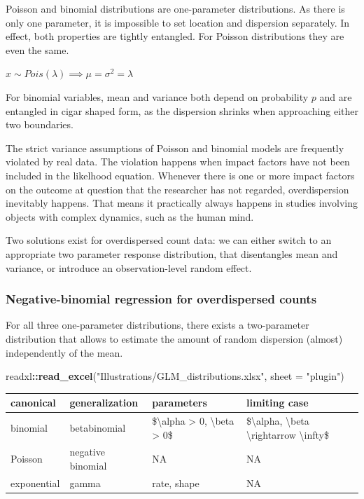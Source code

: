 \documentclass[]{svmono}
\newenvironment{Shaded}{\begin{snugshade}}{\end{snugshade}}
\newcommand{\KeywordTok}[1]{\textcolor[rgb]{0.13,0.29,0.53}{\textbf{#1}}}
\newcommand{\DataTypeTok}[1]{\textcolor[rgb]{0.13,0.29,0.53}{#1}}
\newcommand{\StringTok}[1]{\textcolor[rgb]{0.31,0.60,0.02}{#1}}
\newcommand{\OperatorTok}[1]{\textcolor[rgb]{0.81,0.36,0.00}{\textbf{#1}}}
\newcommand{\NormalTok}[1]{#1}
\theoremstyle{definition}
\theoremstyle{definition}
\theoremstyle{definition}
\theoremstyle{remark}
\begin{document}
Poisson and binomial distributions are one-parameter distributions. As
there is only one parameter, it is impossible to set location and
dispersion separately. In effect, both properties are tightly entangled.
For Poisson distributions they are even the same.

\(x \sim Pois(\lambda) \implies \mu = \sigma^2 = \lambda\)

For binomial variables, mean and variance both depend on probability
\(p\) and are entangled in cigar shaped form, as the dispersion shrinks
when approaching either two boundaries.

The strict variance assumptions of Poisson and binomial models are
frequently violated by real data. The violation happens when impact
factors have not been included in the likelhood equation. Whenever there
is one or more impact factors on the outcome at question that the
researcher has not regarded, overdispersion inevitably happens. That
means it practically always happens in studies involving objects with
complex dynamics, such as the human mind.

Two solutions exist for overdispersed count data: we can either switch
to an appropriate two parameter response distribution, that disentangles
mean and variance, or introduce an observation-level random effect.

\subsubsection{Negative-binomial regression for overdispersed
counts}\label{negative-binomial-regression-for-overdispersed-counts}

For all three one-parameter distributions, there exists a two-parameter
distribution that allows to estimate the amount of random dispersion
(almost) independently of the mean.

\begin{Shaded}
\begin{Highlighting}[]
\NormalTok{readxl}\OperatorTok{::}\KeywordTok{read_excel}\NormalTok{(}\StringTok{"Illustrations/GLM_distributions.xlsx"}\NormalTok{, }\DataTypeTok{sheet =} \StringTok{"plugin"}\NormalTok{)}
\end{Highlighting}
\end{Shaded}

\begin{tabular}{l|l|l|l}
\hline
canonical & generalization & parameters & limiting case\\
\hline
binomial & betabinomial & \$\textbackslash{}alpha > 0, \textbackslash{}beta > 0\$ & \$\textbackslash{}alpha, \textbackslash{}beta \textbackslash{}rightarrow \textbackslash{}infty\$\\
\hline
Poisson & negative binomial & NA & NA\\
\hline
exponential & gamma & rate, shape & NA\\
\hline
\end{tabular}
\end{document}
